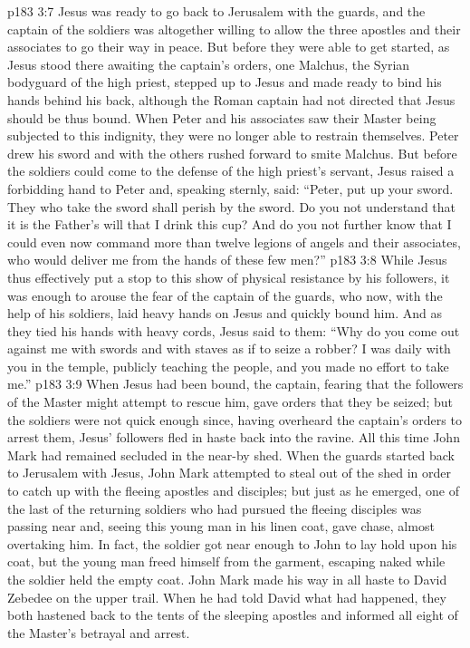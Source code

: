 \vs p183 3:7 Jesus was ready to go back to Jerusalem with the guards, and the captain of the soldiers was altogether willing to allow the three apostles and their associates to go their way in peace. But before they were able to get started, as Jesus stood there awaiting the captain’s orders, one Malchus, the Syrian bodyguard of the high priest, stepped up to Jesus and made ready to bind his hands behind his back, although the Roman captain had not directed that Jesus should be thus bound. When Peter and his associates saw their Master being subjected to this indignity, they were no longer able to restrain themselves. Peter drew his sword and with the others rushed forward to smite Malchus. But before the soldiers could come to the defense of the high priest’s servant, Jesus raised a forbidding hand to Peter and, speaking sternly, said: \textcolor{ubdarkred}{“Peter, put up your sword. They who take the sword shall perish by the sword. Do you not understand that it is the Father’s will that I drink this cup? And do you not further know that I could even now command more than twelve legions of angels and their associates, who would deliver me from the hands of these few men?”}
\vs p183 3:8 While Jesus thus effectively put a stop to this show of physical resistance by his followers, it was enough to arouse the fear of the captain of the guards, who now, with the help of his soldiers, laid heavy hands on Jesus and quickly bound him. And as they tied his hands with heavy cords, Jesus said to them: \textcolor{ubdarkred}{“Why do you come out against me with swords and with staves as if to seize a robber? I was daily with you in the temple, publicly teaching the people, and you made no effort to take me.”}
\vs p183 3:9 When Jesus had been bound, the captain, fearing that the followers of the Master might attempt to rescue him, gave orders that they be seized; but the soldiers were not quick enough since, having overheard the captain’s orders to arrest them, Jesus’ followers fled in haste back into the ravine. All this time John Mark had remained secluded in the near\hyp{}by shed. When the guards started back to Jerusalem with Jesus, John Mark attempted to steal out of the shed in order to catch up with the fleeing apostles and disciples; but just as he emerged, one of the last of the returning soldiers who had pursued the fleeing disciples was passing near and, seeing this young man in his linen coat, gave chase, almost overtaking him. In fact, the soldier got near enough to John to lay hold upon his coat, but the young man freed himself from the garment, escaping naked while the soldier held the empty coat. John Mark made his way in all haste to David Zebedee on the upper trail. When he had told David what had happened, they both hastened back to the tents of the sleeping apostles and informed all eight of the Master’s betrayal and arrest.
